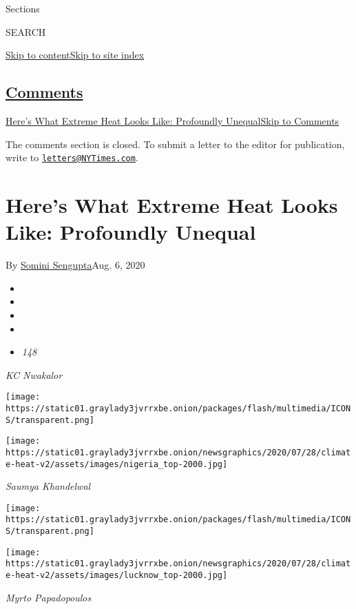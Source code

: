 Sections

SEARCH

\protect\hyperlink{site-content}{Skip to
content}\protect\hyperlink{site-index}{Skip to site index}

\hypertarget{comments}{%
\subsection{\texorpdfstring{\protect\hyperlink{commentsContainer}{Comments}}{Comments}}\label{comments}}

\href{}{Here's What Extreme Heat Looks Like: Profoundly
Unequal}\href{}{Skip to Comments}

The comments section is closed. To submit a letter to the editor for
publication, write to
\href{mailto:letters@NYTimes.com}{\nolinkurl{letters@NYTimes.com}}.

\hypertarget{heres-what-extreme-heat-looks-like-profoundly-unequal}{%
\section{Here's What Extreme Heat Looks Like: Profoundly
Unequal}\label{heres-what-extreme-heat-looks-like-profoundly-unequal}}

By \href{https://www.nytimes3xbfgragh.onion/by/somini-sengupta}{Somini
Sengupta}Aug. 6, 2020

\begin{itemize}
\item
\item
\item
\item
\item
  \emph{148}
\end{itemize}

\emph{KC Nwakalor}

\texttt{[image: https://static01.graylady3jvrrxbe.onion/packages/flash/multimedia/ICONS/transparent.png]}

\texttt{[image: https://static01.graylady3jvrrxbe.onion/newsgraphics/2020/07/28/climate-heat-v2/assets/images/nigeria\_top-2000.jpg]}

\emph{Saumya Khandelwal}

\texttt{[image: https://static01.graylady3jvrrxbe.onion/packages/flash/multimedia/ICONS/transparent.png]}

\texttt{[image: https://static01.graylady3jvrrxbe.onion/newsgraphics/2020/07/28/climate-heat-v2/assets/images/lucknow\_top-2000.jpg]}

\emph{Myrto Papadopoulos}

